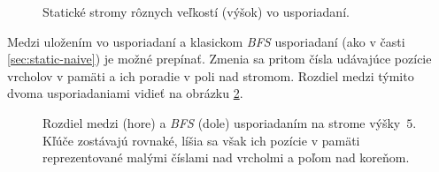 \begin{figure}
    \hspace{0.5cm}
    \caption[Statické stromy rôznych veľkostí]{Statické stromy rôznych veľkostí (výšok) vo  usporiadaní.}
    \label{fig:ss_static_sizes}
\end{figure}

Medzi uložením vo  usporiadaní a klasickom \emph{BFS} usporiadaní (ako v časti \ref{sec:static-naive}) je možné prepínať. Zmenia sa pritom čísla udávajúce pozície vrcholov v pamäti a ich poradie v poli nad stromom. Rozdiel medzi týmito dvoma usporiadaniami vidieť na obrázku \ref{fig:ss_static_order}.

\begin{figure}
    \centering
    \caption[Rozdiel medzi  a \emph{BFS} usporiadaním]{Rozdiel medzi  (hore) a \emph{BFS} (dole) usporiadaním na strome výšky~$5$. Kľúče zostávajú rovnaké, líšia sa však ich pozície v pamäti reprezentované malými číslami nad vrcholmi a poľom nad koreňom.}
    \label{fig:ss_static_order}
\end{figure}

